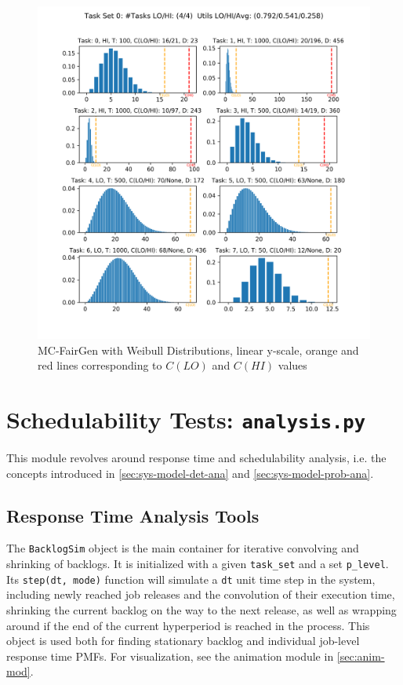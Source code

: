 \documentclass[a4paper,oneside]{csthesis}
\begin{document}
\begin{figure}[p]
    \centering
    \includegraphics[width=\textwidth]{figures/ex_mc_fairgen.png}
    \caption{MC-FairGen with Weibull Distributions, linear y-scale, orange and red lines corresponding to $C(LO)$ and $C(HI)$ values}\label{fig:task-set-mc-fairgen}
\end{figure}

\newpage
\section{Schedulability Tests: \texttt{analysis.py}}
This module revolves around response time and schedulability analysis, i.e. the concepts introduced in \cref{sec:sys-model-det-ana} and \cref{sec:sys-model-prob-ana}.
\subsection{Response Time Analysis Tools}
The \texttt{BacklogSim} object is the main container for iterative convolving and shrinking of backlogs. It is initialized with a given \texttt{task\_set} and a set \texttt{p\_level}. Its \texttt{step(dt, mode)} function will simulate a \texttt{dt} unit time step in the system, including newly reached job releases and the convolution of their execution time, shrinking the current backlog on the way to the next release, as well as wrapping around if the end of the current hyperperiod is reached in the process. This object is used both for finding stationary backlog and individual job-level response time PMFs. For visualization, see the animation module in \cref{sec:anim-mod}.
\end{document}
